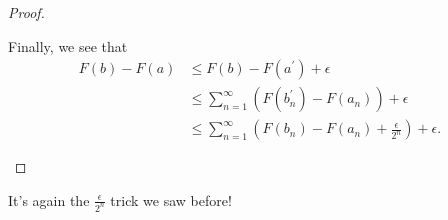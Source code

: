 \begin{proof}
\begin{enumerate}
\begin{itemize}
			            Finally, we see that
			            \[
				            \begin{split}
					            F(b) - F(a)&\leq F(b) - F(a ^\prime )+\epsilon \\
					            &\leq \sum\limits_{n=1}^{\infty} \left(F(b_{n} ^\prime ) - F(a_{n})\right) + \epsilon \\
					            &\leq \sum\limits_{n=1}^{\infty} \left(F(b_{n}) - F(a_{n}) + \frac{\epsilon }{2^n}\right) + \epsilon .
				            \end{split}
			            \]
		      \end{itemize}
	\end{enumerate}
\end{proof}
\begin{remark}
	It's again the \(\frac{\epsilon}{2^n}\) trick we saw before!
\end{remark}